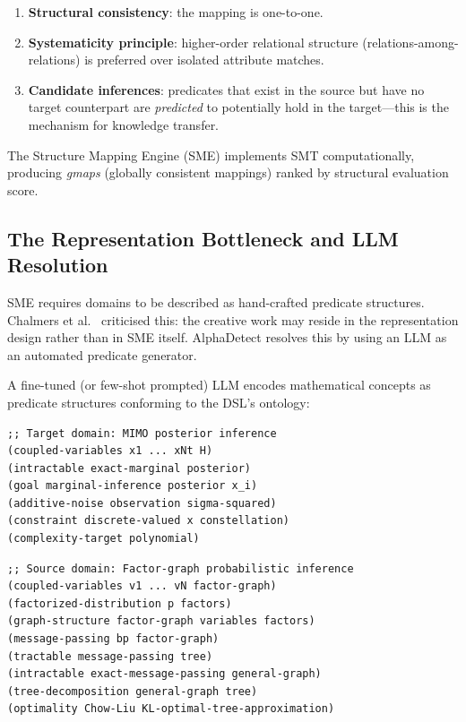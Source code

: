 \documentclass[12pt,a4paper]{article}
\begin{document}
\begin{enumerate}[leftmargin=2em, itemsep=2pt]
  \item \textbf{Structural consistency}: the mapping is one-to-one.
  \item \textbf{Systematicity principle}: higher-order relational structure
        (relations-among-relations) is preferred over isolated attribute matches.
  \item \textbf{Candidate inferences}: predicates that exist in the source
        but have no target counterpart are \emph{predicted} to potentially
        hold in the target---this is the mechanism for knowledge transfer.
\end{enumerate}

\noindent
The Structure Mapping Engine (SME) \cite{falkenhainer1989} implements SMT
computationally, producing \emph{gmaps} (globally consistent mappings) ranked
by structural evaluation score.

\subsection{The Representation Bottleneck and LLM Resolution}

SME requires domains to be described as hand-crafted predicate structures.
Chalmers et al.\ \cite{chalmers1992} criticised this: the creative work may
reside in the representation design rather than in SME itself.
AlphaDetect resolves this by using an LLM as an automated predicate generator.

A fine-tuned (or few-shot prompted) LLM encodes mathematical
concepts as predicate structures conforming to the DSL's ontology:

\vspace{0.3em}
\begin{lstlisting}[style=dsl, caption={LLM-generated predicate encoding of the MIMO posterior inference problem}]
;; Target domain: MIMO posterior inference
(coupled-variables x1 ... xNt H)
(intractable exact-marginal posterior)
(goal marginal-inference posterior x_i)
(additive-noise observation sigma-squared)
(constraint discrete-valued x constellation)
(complexity-target polynomial)
\end{lstlisting}

\begin{lstlisting}[style=dsl, caption={LLM-generated predicate encoding of factor-graph inference (source domain)}]
;; Source domain: Factor-graph probabilistic inference
(coupled-variables v1 ... vN factor-graph)
(factorized-distribution p factors)
(graph-structure factor-graph variables factors)
(message-passing bp factor-graph)
(tractable message-passing tree)
(intractable exact-message-passing general-graph)
(tree-decomposition general-graph tree)
(optimality Chow-Liu KL-optimal-tree-approximation)
\end{lstlisting}
\end{document}
